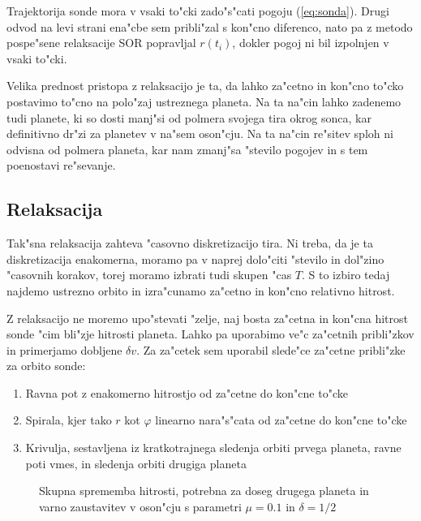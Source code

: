 \documentclass[a4paper,10pt]{article}
\renewcommand{\phi}{\varphi}
\begin{document}
Trajektorija sonde mora v vsaki to"cki zado"s"cati pogoju (\ref{eq:sonda}). Drugi odvod na levi strani ena"cbe sem pribli"zal s kon"cno diferenco, nato pa z metodo pospe"sene relaksacije SOR popravljal $r(t_i)$, dokler pogoj ni bil izpolnjen v vsaki to"cki.

Velika prednost pristopa z relaksacijo je ta, da lahko za"cetno in kon"cno to"cko postavimo to"cno na polo"zaj ustreznega planeta. Na ta na"cin lahko zadenemo tudi planete, ki so dosti manj"si od polmera svojega tira okrog sonca, kar definitivno dr"zi za planetev v na"sem oson"cju. Na ta na"cin re"sitev sploh ni odvisna od polmera planeta, kar nam zmanj"sa "stevilo pogojev in s tem poenostavi re"sevanje. 

\subsection{Relaksacija}

Tak"sna relaksacija zahteva "casovno diskretizacijo tira. Ni treba, da je ta diskretizacija enakomerna, moramo pa v naprej dolo"citi "stevilo in dol"zino "casovnih korakov, torej moramo izbrati tudi skupen "cas $T$. S to izbiro tedaj najdemo ustrezno orbito in izra"cunamo za"cetno in kon"cno relativno hitrost. 

Z relaksacijo ne moremo upo"stevati "zelje, naj bosta za"cetna in kon"cna hitrost sonde "cim bli"zje hitrosti planeta. Lahko pa uporabimo ve"c za"cetnih pribli"zkov in primerjamo dobljene $\delta v$. Za za"cetek sem uporabil slede"ce za"cetne pribli"zke za orbito sonde:

\begin{enumerate}
 \item Ravna pot z enakomerno hitrostjo od za"cetne do kon"cne to"cke
 \item Spirala, kjer tako $r$ kot $\phi$ linearno nara"s"cata od za"cetne do kon"cne to"cke
 \item Krivulja, sestavljena iz kratkotrajnega sledenja orbiti prvega planeta, ravne poti vmes, in sledenja orbiti drugiga planeta
\end{enumerate}

\begin{figure}
\centering
 
 \caption{Skupna sprememba hitrosti, potrebna za doseg drugega planeta in varno zaustavitev v oson"cju s parametri $\mu=0.1$ in $\delta = 1/2$}
 \label{fig:hitrost}
\end{figure}
\end{document}

